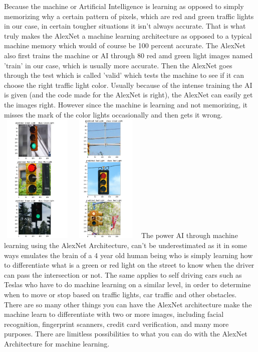 Because the machine or Artificial Intelligence is learning as opposed to simply memorizing why a certain pattern of pixels, which are red and green traffic lights in our case, in certain tougher situations it isn't always accurate. That is what truly makes the AlexNet a machine learning architecture as opposed to a typical machine memory which would of course be 100 percent accurate. The AlexNet also first trains the machine or AI through 80 red amd green light images named  'train' in our case, which is usually more accurate. Then the AlexNet goes through the test which is called 'valid' which tests the machine to see if it can choose the right traffic light color. Usually because of the intense training the AI is given (and the code made for the AlexNet is right), the AlexNet can easily get the images right. However since the machine is learning and not memorizing, it misses the mark of the color lights occasionally and then gets it wrong. 
\newline
\newline
\includegraphics[height =6.25cm,width=3.5cm]{pictures result1.PNG}
\includegraphics[height =6.25cm,width=3.5cm]{pictures result2.PNG}
\newline
\newline
The power AI through machine learning using the AlexNet Architecture, can't be underestimated as it in some ways emulates the brain of a 4 year old human being who is simply learning how to differentiate what is a green or red light on the street to know when the driver can pass the intersection or not. The same applies to self driving cars such as Teslas who have to do machine learning on a similar level, in order to determine when to move or stop based on traffic lights, car traffic and other obstacles. There are so many other things you can have the AlexNet architecture make the machine learn to differentiate with two or more images, including facial recognition, fingerprint scanners, credit card verification, and many more purposes. There are limitless possibilities to what you can do with the AlexNet Architecture for machine learning.